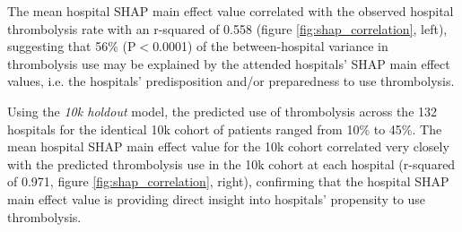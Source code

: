 The mean hospital SHAP main effect value correlated with the observed hospital thrombolysis rate with an r-squared of 0.558 (figure \ref{fig:shap_correlation}, left), suggesting that 56\% (P$<$0.0001) of the between-hospital variance in thrombolysis use may be explained by the attended hospitals' SHAP main effect values, i.e. the hospitals' predisposition and/or preparedness to use thrombolysis.

Using the \emph{10k holdout} model, the predicted use of thrombolysis across the 132 hospitals for the identical 10k cohort of patients ranged from 10\% to 45\%. The mean hospital SHAP main effect value for the 10k cohort correlated very closely with the predicted thrombolysis use in the 10k cohort at each hospital (r-squared of 0.971, figure \ref{fig:shap_correlation}, right), confirming that the hospital SHAP main effect value is providing direct insight into hospitals' propensity to use thrombolysis.

